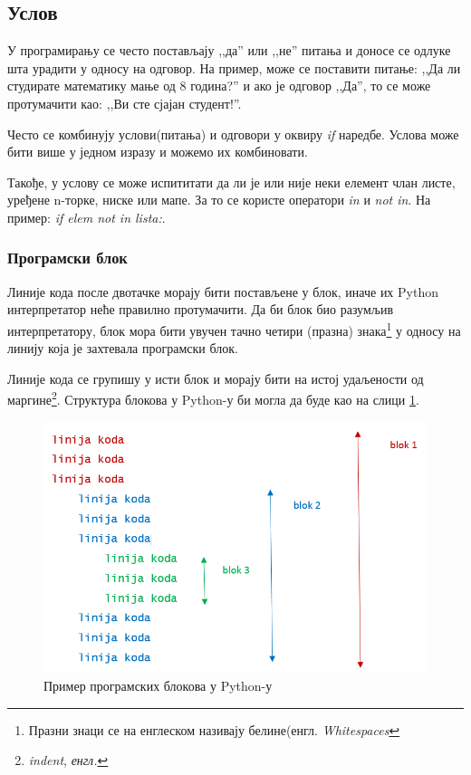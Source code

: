 \subsection{Услов}

У програмирању се често постављају ,,да'' или ,,не'' питања и доносе се одлуке шта урадити у односу на одговор. На пример, може се поставити питање: ,,Да ли студирате математику мање од 8 година?'' и ако је одговор ,,Да'', то се може протумачити као: ,,Ви сте сјајан студент!''.

Често се комбинују услови(питања) и одговори у оквиру \emph{if} наредбе. Услова може бити више у једном изразу и можемо их комбиновати.

Такође, у услову се може испититати да ли је или није неки елемент члан листе, уређене n-торке, ниске или мапе.  За то се користе оператори \emph{in} и \emph{not in}. На пример: \emph{if elem not in lista:}.

\subsubsection{Програмски блок}

Линије кода после двотачке морају бити постављене у блок, иначе их Python интерпретатор неће правилно протумачити. Да би блок био разумљив интерпретатору, блок мора бити увучен тачно четири (празна) знака\footnote{Празни знаци се на енглеском називају белине(енгл. \emph{Whitespaces}}  у односу на линију која је захтевала програмски блок\cite{PEP}.

Линије кода се групишу у исти блок и морају бити на истој удаљености од маргине\footnote{\emph{indent}, \emph{енгл.}}. Структура блокова у Python-у би могла да буде као на слици \ref{slike:whitespace}.

\begin{figure}[here]
\centering
\includegraphics[scale=0.5]{whitespace.png}
\caption{Пример програмских блокова у Python-у}
\label{slike:whitespace}
\end{figure}

